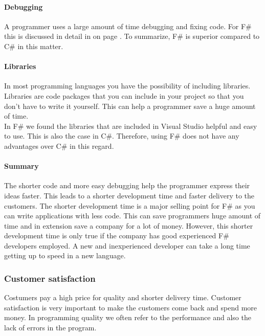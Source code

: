 \documentclass[12pt, a4paper]{article}
\begin{document}
\paragraph{Debugging}

A programmer uses a large amount of time debugging and fixing code. For F\# this is discussed in detail in  on page \pageref{debug}. To summarize, F\# is superior compared to C\# in this matter.

\paragraph{Libraries}

In most programming languages you have the possibility of including libraries. Libraries are code packages that you can include in your project so that you don't have to write it yourself. This can help a programmer save a huge amount of time.\\

In F\# we found the libraries that are included in Visual Studio helpful and easy to use. This is also the case in C\#. Therefore, using F\# does not have any advantages over C\# in this regard. 

\paragraph{Summary}
The shorter code and more easy debugging help the programmer express their ideas faster. This leads to a shorter development time and faster delivery to the customers. The shorter development time is a major selling point for F\# as you can write applications with less code. This can save programmers huge amount of time and in extension save a company for a lot of money. However, this shorter development time is only true if the company has good experienced F\# developers employed. A new and inexperienced developer can take a long time getting up to speed in a new language.

\newpage
\subsubsection{Customer satisfaction}
Costumers pay a high price for quality and shorter delivery time. Customer satisfaction is very important to make the customers come back and spend more money. In programming quality we often refer to the performance and also the lack of errors in the program.\\
\end{document}
